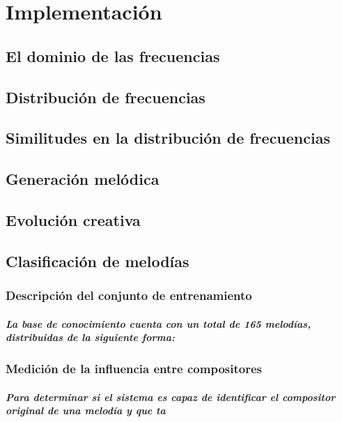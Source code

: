 \chapter {Implementación}
    \section {El dominio de las frecuencias}
    \section {Distribución de frecuencias}
    \section {Similitudes en la distribución de frecuencias}
    \section {Generación melódica}
    \section {Evolución creativa}



\section{Clasificación de melodías}


\subsection{Descripción del conjunto de entrenamiento}
\paragraph{La base de conocimiento cuenta con un total de 165 melodías, distribuidas de la siguiente forma:}




\subsection{Medición de la influencia entre compositores}
\paragraph{Para determinar si el sistema es capaz de identificar el compositor original de una melodía y que ta}

